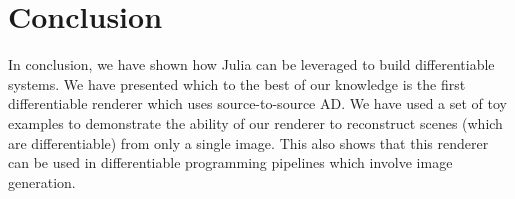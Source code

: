\documentclass{juliacon}
\begin{document}
\section{Conclusion}

In conclusion, we have shown how Julia can be leveraged to build differentiable systems. We have presented which to the best of our knowledge is the first differentiable renderer which uses source-to-source AD. We have used a set of toy examples to demonstrate the ability of our renderer to reconstruct scenes (which are differentiable) from only a single image. This also shows that this renderer can be used in differentiable programming pipelines which involve image generation.




\end{document}

